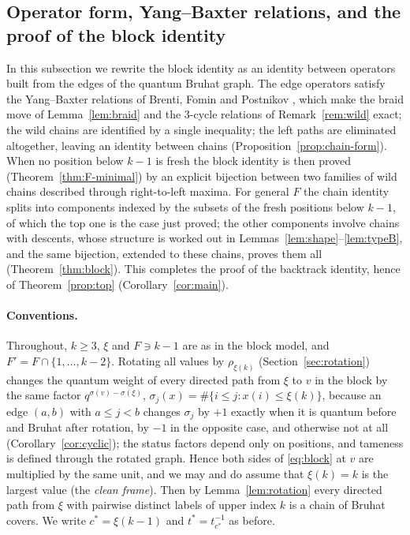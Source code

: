 \documentclass[11pt]{article}
\begin{document}
\subsection{Operator form, Yang--Baxter relations, and the proof of the
block identity}
\label{sec:ybe}

In this subsection we rewrite the block identity as an identity
between operators built from the edges of the quantum Bruhat graph.
The edge operators satisfy the Yang--Baxter relations of
Brenti, Fomin and Postnikov \cite{brenti1999mixed}, which make the
braid move of Lemma~\ref{lem:braid} and the $3$-cycle relations of
Remark~\ref{rem:wild} exact; the wild chains are identified by a
single inequality; the left paths are eliminated altogether, leaving
an identity between chains (Proposition~\ref{prop:chain-form}). When
no position below $k-1$ is fresh the block identity is then proved
(Theorem~\ref{thm:F-minimal}) by an explicit bijection between two
families of wild chains described through right-to-left maxima. For
general $F$ the chain identity splits into components indexed by the
subsets of the fresh positions below $k-1$, of which the top one is
the case just proved; the other components involve chains with
descents, whose structure is worked out in
Lemmas~\ref{lem:shape}--\ref{lem:typeB}, and the same bijection,
extended to these chains, proves them all (Theorem~\ref{thm:block}).
This completes the proof of the backtrack identity, hence of
Theorem~\ref{prop:top} (Corollary~\ref{cor:main}).

\paragraph{Conventions.}
Throughout, $k\geq3$, $\xi$ and $F\ni k-1$ are as in the block model,
and $F'=F\cap\{1,\ldots,k-2\}$. Rotating all values by
$\rho_{\xi(k)}$ (Section~\ref{sec:rotation}) changes the quantum
weight of every directed path from $\xi$ to $v$ in the block by the
same factor $q^{\sigma(v)-\sigma(\xi)}$, $\sigma_j(x)=\#\{i\leq j:x(i)\leq\xi(k)\}$,
because an edge $(a,b)$ with $a\leq j<b$ changes $\sigma_j$ by $+1$
exactly when it is quantum before and Bruhat after rotation, by $-1$
in the opposite case, and otherwise not at all
(Corollary~\ref{cor:cyclic}); the status factors depend only on
positions, and tameness is defined through the rotated graph. Hence
both sides of \eqref{eq:block} at $v$ are multiplied by the same unit,
and we may and do assume that $\xi(k)=k$ is the largest value (the
\emph{clean frame}). Then by Lemma~\ref{lem:rotation} every directed
path from $\xi$ with pairwise distinct labels of upper index $k$ is a
chain of Bruhat covers. We write $c^\ast=\xi(k-1)$ and
$t^\ast=t_{c^\ast}^{-1}$ as before.
\end{document}
